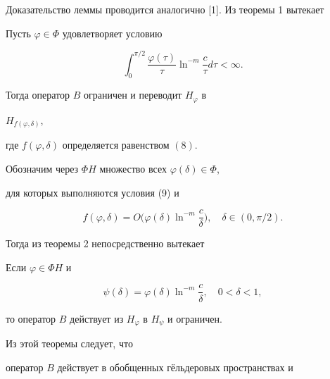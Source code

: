 Доказательство леммы проводится аналогично [1]. Из теоремы 1 вытекает





\begin{thm}


Пусть $\varphi \in \Phi $ удовлетворяет условию


\begin{equation}


\int_0^{\pi/2} \frac{\varphi(\tau)}{\tau}


\ln^{-m}\frac{c}{\tau} d\tau < \infty.


\end{equation}


Тогда оператор $B$ ограничен и переводит $H_\varphi$ в 


$H_{f(\varphi,\delta)}$,


где $f(\varphi,\delta)$ определяется равенством $(8)$.


\end{thm}





Обозначим через $\Phi H$ множество всех $\varphi(\delta) \in \Phi$,


для которых выполняются условия (9) и


$$


f(\varphi,\delta) = O\bigg({\varphi(\delta)


\ln^{-m}\frac{c}{\delta}}\bigg), \quad \delta \in (0,\pi/2).


$$


Тогда из теоремы 2 непосредственно вытекает





\begin{thm}


Если $\varphi \in \Phi H$ и


$$


\psi(\delta) = \varphi(\delta) \ln^{-m}\frac{c}{\delta}, \quad 0<\delta<1,


$$


то оператор $B$ действует из $H_\varphi$ в $H_\psi$ и ограничен.


\end{thm}





Из этой теоремы следует, что


оператор $B$ действует в обобщенных г\"ельдеровых пространствах и


